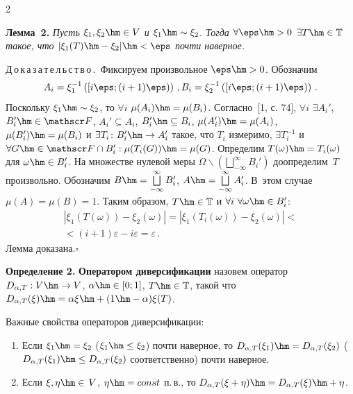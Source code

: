 \begin{multicols}{2}
\columnbreak

\noindent

\textbf{Лемма~2.}
\textit{Пусть $\xi_1, \xi_2 \hm\in V $ и $\xi_1 \hm\sim \xi_2$. Тогда
$ \forall \eps \hm> 0$ $\exists  T \hm\in \classT$ такое, что $
|\xi_1(T)\hm-\xi_2|\hm<\eps $ почти наверное.} 

\medskip

\noindent
Д\,о\,к\,а\,з\,а\,т\,е\,л\,ь\,с\,т\,в\,о\,.\ Фиксируем произвольное
$\eps \hm> 0 $. Обозначим
$$
A_i = \xi_1^{-1}\left(  \left[  i \eps ; (i+1) \eps \right) \right )\,,  \\
B_i = \xi_2^{-1}\left( \left [  i \eps ; (i+1) \eps \right ) \right )\,.
$$
Поскольку $\xi_1 \hm\sim \xi_2$, то $\forall i$  $\mu(A_i) \hm=
\mu(B_i)$. Согласно~[1, с. 74], $\forall i$ $\exists
A_i'$, $B_i' \hm\in \sigmaF$, $A_i' \subseteq A_i$,
$B_i' \hm\subseteq B_i$, $\mu(A_i') \hm= \mu(A_i)$, $\mu(B_i')\hm =
\mu(B_i)$ и $\exists T_i \colon B_i' \hm\to A_i'$ такое, что $T_i$
измеримо, $\exists T_i^{-1}$ и $\forall G \hm\in \sigmaF \cap B_i': 
\mu(T_i(G)) \hm= \mu(G)$. Определим $T(\omega) \hm= T_i(\omega)$ для 
$\omega \hm\in B_i'$. На множестве нулевой меры $\Omega
\backslash (\bigsqcup\limits_{-\infty}^\infty B_i')$ доопределим~$T$ 
произвольно. Обозначим $B \hm= \bigsqcup\limits_{-\infty}^\infty
B_i'$, $A \hm= \bigsqcup\limits_{-\infty}^\infty A_i'$. В~этом случае
$\mu(A) = \mu(B) = 1$. Таким образом, $T \hm\in \classT$ и $\forall i
\ \forall \omega \hm\in B_i' $:
\begin{multline*}
| \xi_1(T(\omega)) - \xi_2(\omega) | = | \xi_1(T_i(\omega)) -
\xi_2(\omega) | <{}\\
{}< (i+1) \varepsilon - i \varepsilon =
\varepsilon\,.
\end{multline*} 
Лемма доказана.\hfill$\square$ 

\medskip

\noindent
\textbf{Определение 2.}
\textbf{Оператором диверсификации} назовем оператор
$D_{\alpha,T} : V \hm\rightarrow V$, $\alpha \hm\in [0;1]$, $T \hm\in \classT$,
такой что $D_{\alpha,T}(\xi) \hm= \alpha \xi \hm+ ( 1 \hm- \alpha ) \xi(T)$.

Важные свойства операторов диверсификации:
\begin{enumerate}
\item Если $\xi_1 \hm= \xi_2$ ($\xi_1 \hm\le \xi_2$) почти наверное, то
$D_{\alpha,T}(\xi_1) \hm= D_{\alpha,T}(\xi_2)$ 
($D_{\alpha,T}(\xi_1) \hm\le D_{\alpha,T}(\xi_2)$  соответственно)
 почти наверное.
\item Если $\xi,\eta\hm\in\,V$, $\eta\hm=const$ п.\,в., 
то $D_{\alpha,T}(\xi+\eta) \hm= D_{\alpha,T}(\xi) \hm+ \eta$.
\end{enumerate}


\end{multicols}
